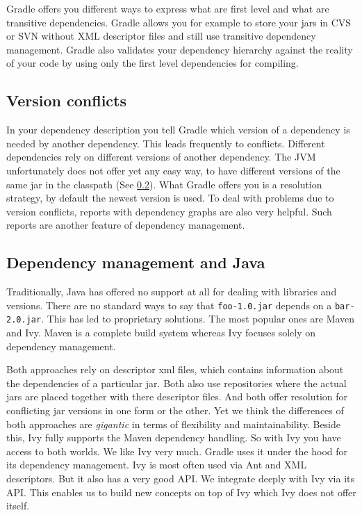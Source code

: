 Gradle offers you different ways to express what are first level and what are transitive dependencies. Gradle allows you for example to store your jars in CVS or SVN without XML descriptor files and still use transitive dependency management. Gradle also validates your dependency hierarchy against the reality of your code by using only the first level dependencies for compiling.

\subsection{Version conflicts} %
\label{sub:version_conflicts}
In your dependency description you tell Gradle which version of a dependency is needed by another dependency. This leads frequently to conflicts. Different dependencies rely on different versions of another dependency. The JVM unfortunately does not offer yet any easy way, to have different versions of the same jar in the classpath (See \ref{sub:dependency_management_and_java}). What Gradle offers you is a resolution strategy, by default the newest version is used. To deal with problems due to version conflicts, reports with dependency graphs are also very helpful. Such reports are another feature of dependency management.

\subsection{Dependency management and Java} %
\label{sub:dependency_management_and_java}
Traditionally, Java has offered no support at all for dealing with libraries and versions. There are no standard ways to say that \texttt{foo-1.0.jar} depends on a \texttt{bar-2.0.jar}. This has led to proprietary solutions. The most popular ones are Maven and Ivy. Maven is a complete build system whereas Ivy focuses solely on dependency management.

Both approaches rely on descriptor xml files, which contains information about the dependencies of a particular jar. Both also use repositories where the actual jars are placed together with there descriptor files. And both offer resolution for conflicting jar versions in one form or the other. Yet we think the differences of both approaches are \emph{gigantic} in terms of flexibility and maintainability. Beside this, Ivy fully supports the Maven dependency handling. So with Ivy you have access to both worlds. We like Ivy very much. Gradle uses it under the hood for its dependency management. Ivy is most often used via Ant and XML descriptors. But it also has a very good API. We integrate deeply with Ivy via its API. This enables us to build new concepts on top of Ivy which Ivy does not offer itself.

